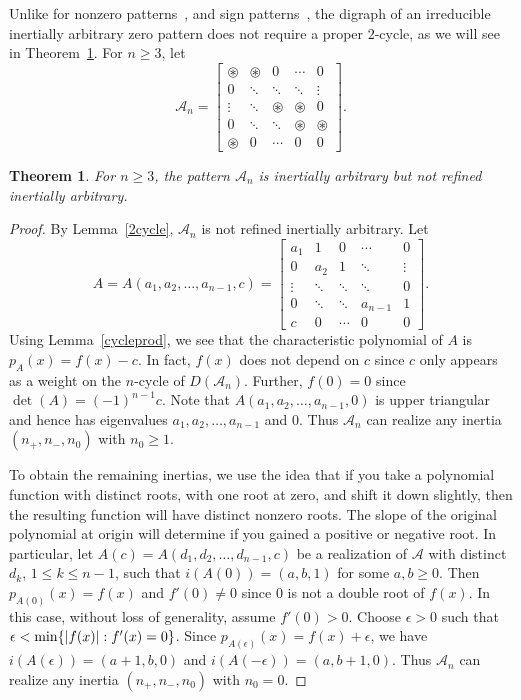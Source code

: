 \documentclass[10pt]{amsart}
\newtheorem{theorem}[proposition]{Theorem}
\begin{document}
Unlike for nonzero patterns~\cite[Lemma 2.1]{CV4}, and sign patterns~\cite[Lemma 5.1]{CV}, the digraph of an irreducible inertially arbitrary zero pattern does not require a proper $2$-cycle, as we will see in Theorem~\ref{IAPN}. 
For $n\geq 3$, let
$${\mathcal{A}}_n = \left[ \begin{array}{ccccc}
{\circledast} 	& {\circledast} 	& 0			& \cdots 	& 0\\
0 		& \ddots	& \ddots		& \ddots  	& \vdots\\
\vdots 	& \ddots	& {\circledast}  	& {\circledast}		& 0\\
0	& \ddots	& \ddots  	& {\circledast} 		& {\circledast} \\
{\circledast}  	& 0		& \cdots  	& 0  		& 0 \end{array} \right].$$

\begin{theorem}\label{IAPN}
	For $n\geq 3$, the pattern ${\mathcal{A}}_n$ is inertially arbitrary but
not refined inertially arbitrary.
\end{theorem}

\begin{proof} By Lemma~\ref{2cycle}, ${\mathcal{A}}_n$ is not refined inertially arbitrary.
	Let 
	$$A=A(a_1,a_2,\ldots,a_{n-1},c) = \left[ \begin{array}{ccccc}
a_1 		& 1 		& 0			& \cdots 	& 0\\
0 		& a_2	& 1			& \ddots  	& \vdots\\
\vdots 	& \ddots	& \ddots  	& \ddots		& 0\\
0	& \ddots	& \ddots  	& a_{n-1} 		& 1 \\
c	  	& 0		& \cdots  	& 0  		& 0 \end{array} \right].$$ 
Using Lemma~\ref{cycleprod}, we see that the characteristic polynomial of $A$ is $p_A(x)=f(x)-c$. In fact,
 $f(x)$ does not depend on $c$ since $c$ only appears as a weight on 
the $n$-cycle of $D({\mathcal{A}}_n)$. Further, $f(0)=0$ since $\det(A)=(-1)^{n-1}c$.
Note that $A(a_1,a_2,\ldots,a_{n-1},0)$ is upper triangular and hence has 
eigenvalues $a_1,a_2,\ldots,a_{n-1}$ and $0$. Thus ${\mathcal{A}}_n$ can realize any
inertia $(n_+,n_-,n_0)$ with $n_0\geq 1$.

To obtain the remaining inertias, we use the idea that if you take a polynomial function with
distinct roots, with one root at zero, and shift it
down slightly, then the resulting function will have
distinct nonzero roots. The slope of the original
polynomial at origin will determine if you gained a positive or
negative root. In particular, let $A(c)=A(d_1,d_2,\ldots,d_{n-1},c)$ be a realization of ${\mathcal{A}}$ with
distinct $d_k$, $1\leq k\leq n-1$, such that $i(A(0))=(a,b,1)$ for some $a,b \geq 0$. Then
$p_{A(0)}(x)=f(x)$ and $f'(0)\neq 0$ since 0 is not a double root of $f(x)$.
In this case, without loss of generality, assume $f'(0)>0$. Choose 
$\epsilon>0$ such that $\epsilon < {\rm{min}}\{|f(x)| : f'(x)=0 \}$. Since
$p_{A(\epsilon)}(x)=f(x) +\epsilon$, we have $i(A(\epsilon))=(a+1,b,0)$
and $i(A(-\epsilon))=(a,b+1,0)$. Thus ${\mathcal{A}}_n$ can realize any
inertia $(n_+,n_-,n_0)$ with $n_0 = 0$.
\end{proof}
\end{document}
